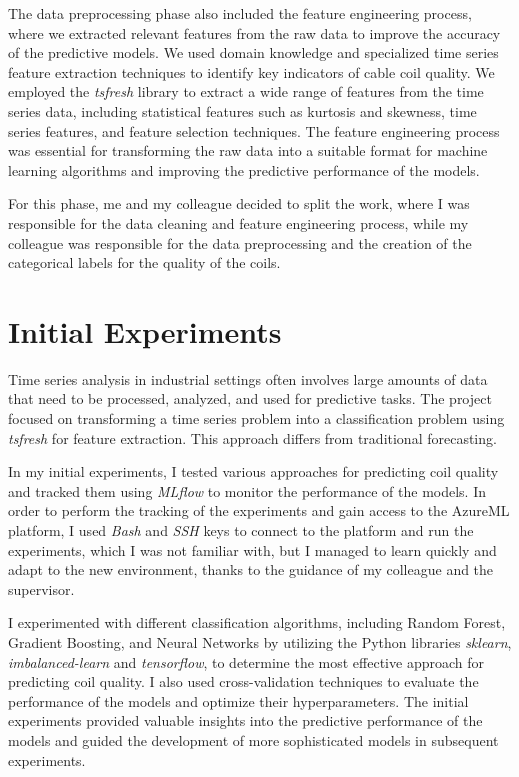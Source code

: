 The data preprocessing phase also included the feature engineering process,
where we extracted relevant features from the raw data to improve the accuracy
of the predictive models. We used domain knowledge and specialized time series
feature extraction techniques to identify key indicators of cable coil quality.
We employed the \emph{tsfresh} library to extract a wide range of features from
the time series data, including statistical features such as kurtosis and
skewness, time series features, and feature selection techniques. The feature
engineering process was essential for transforming the raw data into a suitable
format for machine learning algorithms and improving the predictive performance
of the models.

For this phase, me and my colleague decided to split the work, where I was
responsible for the data cleaning and feature engineering process, while my
colleague was responsible for the data preprocessing and the creation of the
categorical labels for the quality of the coils.

\section{Initial Experiments}

Time series analysis in industrial settings often involves large amounts of
data that need to be processed, analyzed, and used for predictive tasks. The
project focused on transforming a time series problem into a classification
problem using \emph{tsfresh} for feature extraction. This approach differs from
traditional forecasting.

In my initial experiments, I tested various approaches for predicting coil
quality and tracked them using \emph{MLflow} to monitor the performance of the
models. In order to perform the tracking of the experiments and gain access to
the AzureML platform, I used \emph{Bash} and \emph{SSH} keys to connect to the
platform and run the experiments, which I was not familiar with, but I managed
to learn quickly and adapt to the new environment, thanks to the guidance of my
colleague and the supervisor.

I experimented with different classification algorithms, including Random
Forest, Gradient Boosting, and Neural Networks by utilizing the Python
libraries \emph{sklearn}, \emph{imbalanced-learn} and \emph{tensorflow}, to
determine the most effective approach for predicting coil quality. I also used
cross-validation techniques to evaluate the performance of the models and
optimize their hyperparameters. The initial experiments provided valuable
insights into the predictive performance of the models and guided the
development of more sophisticated models in subsequent experiments.

